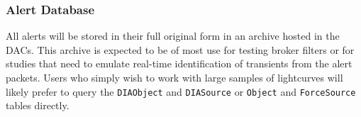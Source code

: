 \subsubsection{Alert Database} \label{sec:alertdb}

All alerts will be stored in their full original form in an archive hosted in the DACs.
This archive is expected to be of most use for testing broker filters or for studies that need to emulate real-time identification of transients from the alert packets.
Users who simply wish to work with large samples of lightcurves will likely prefer to query the \texttt{DIAObject} and \texttt{DIASource} or \texttt{Object} and \texttt{ForceSource} tables directly.

